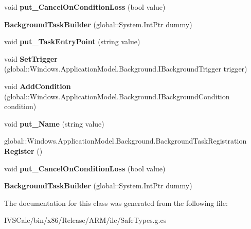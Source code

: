 \begin{DoxyCompactItemize}
void {\bfseries put\+\_\+\+Cancel\+On\+Condition\+Loss} (bool value)
\item 
\mbox{\label{class_windows_1_1_application_model_1_1_background_1_1_background_task_builder_ab4df7612969c0e3657f25a103ae10fdb}} 
{\bfseries Background\+Task\+Builder} (global\+::\+System.\+Int\+Ptr dummy)
\item 
\mbox{\label{class_windows_1_1_application_model_1_1_background_1_1_background_task_builder_a35a57878e11b366a14d19cfe9b9168c9}} 
void {\bfseries put\+\_\+\+Task\+Entry\+Point} (string value)
\item 
\mbox{\label{class_windows_1_1_application_model_1_1_background_1_1_background_task_builder_ad3977b98abc7d118a48c9e6d131bc233}} 
void {\bfseries Set\+Trigger} (global\+::\+Windows.\+Application\+Model.\+Background.\+I\+Background\+Trigger trigger)
\item 
\mbox{\label{class_windows_1_1_application_model_1_1_background_1_1_background_task_builder_a9012601dbb13cc38b6863575770044f0}} 
void {\bfseries Add\+Condition} (global\+::\+Windows.\+Application\+Model.\+Background.\+I\+Background\+Condition condition)
\item 
\mbox{\label{class_windows_1_1_application_model_1_1_background_1_1_background_task_builder_a4250f9dec67adfee854b2884069c027b}} 
void {\bfseries put\+\_\+\+Name} (string value)
\item 
\mbox{\label{class_windows_1_1_application_model_1_1_background_1_1_background_task_builder_a97adeab2432933ca3bc4ee6e4852e5a0}} 
global\+::\+Windows.\+Application\+Model.\+Background.\+Background\+Task\+Registration {\bfseries Register} ()
\item 
\mbox{\label{class_windows_1_1_application_model_1_1_background_1_1_background_task_builder_a0739c66afd9bb62e0746d82fc02b1ca0}} 
void {\bfseries put\+\_\+\+Cancel\+On\+Condition\+Loss} (bool value)
\item 
\mbox{\label{class_windows_1_1_application_model_1_1_background_1_1_background_task_builder_ab4df7612969c0e3657f25a103ae10fdb}} 
{\bfseries Background\+Task\+Builder} (global\+::\+System.\+Int\+Ptr dummy)
\end{DoxyCompactItemize}


The documentation for this class was generated from the following file\+:\begin{DoxyCompactItemize}
\item 
I\+V\+S\+Calc/bin/x86/\+Release/\+A\+R\+M/ilc/Safe\+Types.\+g.\+cs\end{DoxyCompactItemize}
